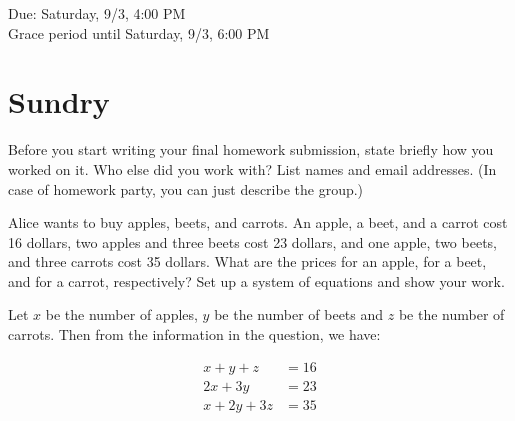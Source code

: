 \documentclass[11pt]{article}
\begin{document}
\maketitle
\fontsize{12}{15}\selectfont

\begin{center}
    Due: Saturday, 9/3, 4:00 PM \\
    Grace period until Saturday, 9/3, 6:00 PM \\
\end{center}

\section*{Sundry}
Before you start writing your final homework submission, state briefly how you worked on it.  Who else did you work with?  List names and email addresses.  (In case of homework party, you can just describe the group.)

\vspace{15pt}


Alice wants to buy apples, beets, and carrots. An apple, a beet, and a carrot cost 16 dollars, two apples and three beets cost 23 dollars, and one apple, two beets, and three carrots cost 35 dollars. What are the prices for an apple, for a beet, and for a carrot, respectively? Set up a system of equations and show your work.

\begin{solution}
    Let $x$ be the number of apples, $y$ be the number of beets and $z$ be the number of carrots. Then from the information in the question, we have: 

    \begin{align}
        \label{eq1} x + y + z &= 16\\
        \label{eq2} 2x + 3y &= 23\\
        \label{eq3} x + 2y + 3z &= 35
    \end{align}

    
\end{solution}

\end{document}
